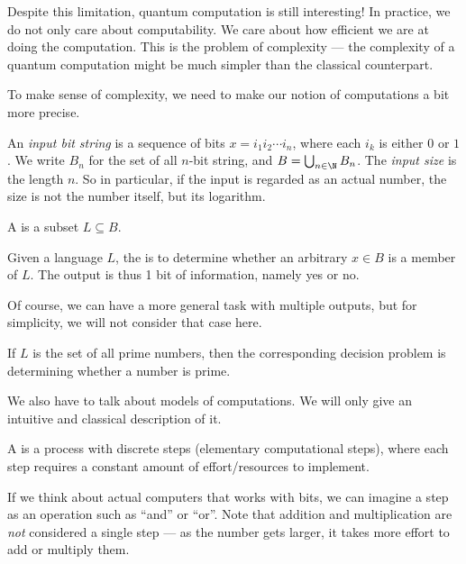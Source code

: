 \documentclass[a4paper]{article}
\begin{document}
Despite this limitation, quantum computation is still interesting! In practice, we do not only care about computability. We care about how efficient we are at doing the computation. This is the problem of complexity --- the complexity of a quantum computation might be much simpler than the classical counterpart.

To make sense of complexity, we need to make our notion of computations a bit more precise.

\begin{defi}
  An \emph{input bit string} is a sequence of bits $x = i_1i_2 \cdots i_n$, where each $i_k$ is either $0$ or $1$. We write $B_n$ for the set of all $n$-bit string, and $B = \bigcup_{n \in \N} B_n$. The \emph{input size} is the length $n$. So in particular, if the input is regarded as an actual number, the size is not the number itself, but its logarithm.
\end{defi}

\begin{defi}[Language]
  A  is a subset $L\subseteq B$.
\end{defi}

\begin{defi}
  Given a language $L$, the  is to determine whether an arbitrary $x \in B$ is a member of $L$. The output is thus 1 bit of information, namely yes or no.
\end{defi}
Of course, we can have a more general task with multiple outputs, but for simplicity, we will not consider that case here.

\begin{eg}
  If $L$ is the set of all prime numbers, then the corresponding decision problem is determining whether a number is prime.
\end{eg}

We also have to talk about models of computations. We will only give an intuitive and classical description of it.
\begin{defi}
  A  is a process with discrete steps (elementary computational steps), where each step requires a constant amount of effort/resources to implement.
\end{defi}
If we think about actual computers that works with bits, we can imagine a step as an operation such as ``and'' or ``or''. Note that addition and multiplication are \emph{not} considered a single step --- as the number gets larger, it takes more effort to add or multiply them.
\end{document}
